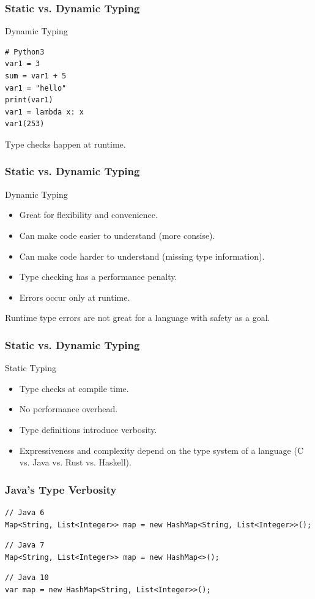 \begin{frame}[fragile]
    \frametitle{Static vs. Dynamic Typing}
    Dynamic Typing
    \vfill
    \begin{verbatim}
# Python3
var1 = 3
sum = var1 + 5
var1 = "hello"
print(var1)
var1 = lambda x: x
var1(253)
    \end{verbatim}
    \pause
    \vfill
    Type checks happen at runtime.
\end{frame}

\begin{frame}[fragile]
    \frametitle{Static vs. Dynamic Typing}
    Dynamic Typing
    \vfill
    \begin{itemize}
        \item Great for flexibility and convenience.
        \item Can make code easier to understand (more consise).
        \pause
        \vspace{.3cm}
        \item Can make code harder to understand (missing type information).
        \pause
        \item Type checking has a performance penalty.
        \item Errors occur only at runtime.
    \end{itemize}
    \pause
    \vfill
    Runtime type errors are not great for a language with safety as a goal.
\end{frame}

\begin{frame}[fragile]
    \frametitle{Static vs. Dynamic Typing}
    Static Typing
    \pause
    \vfill
    \begin{itemize}
        \item Type checks at compile time.
        \item No performance overhead.
        \pause
        \vspace{.3cm}
        \item Type definitions introduce verbosity.
        \item Expressiveness and complexity depend on the type system of a language (C vs. Java vs. Rust vs. Haskell).
    \end{itemize}
\end{frame}

\begin{frame}[fragile]
    \frametitle{Java's Type Verbosity}
    \begin{verbatim}
// Java 6
Map<String, List<Integer>> map = new HashMap<String, List<Integer>>();
    \end{verbatim}
    \pause
    \vfill
    \begin{verbatim}
// Java 7
Map<String, List<Integer>> map = new HashMap<>();
    \end{verbatim}
    \pause
    \vfill
    \begin{verbatim}
// Java 10
var map = new HashMap<String, List<Integer>>();
    \end{verbatim}
\end{frame}

